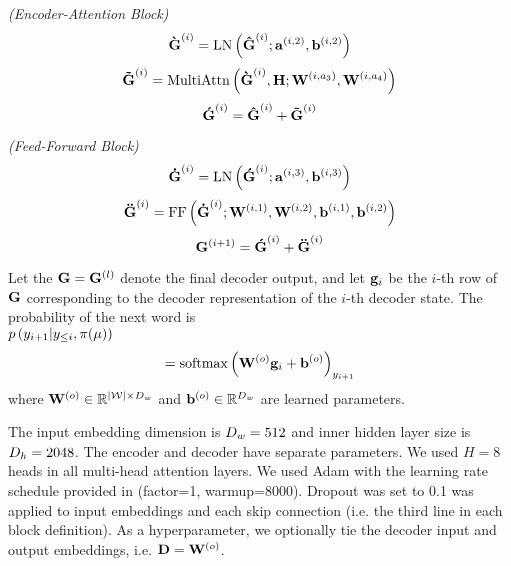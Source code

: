 \noindent \textit{(Encoder-Attention Block)}\\
\[\boldsymbol{\grave{\mathbf{G}}}^{(i)} = \operatorname{LN}\left(\boldsymbol{\hat{\mathbf{G}}}^{(i)}; \mathbf{a}^{(i,2)}, \mathbf{b}^{(i,2)}\right)\]
\[\boldsymbol{\tilde{\mathbf{G}}}^{(i)} = \operatorname{MultiAttn}\left(\boldsymbol{\grave{\mathbf{G}}}^{(i)}, \mathbf{H}; \mathbf{W}^{(i,a_3)}, \mathbf{W}^{(i,a_4)}\right)\]
\[\boldsymbol{\acute{\mathbf{G}}}^{(i)} = \boldsymbol{\hat{\mathbf{G}}}^{(i)} + \boldsymbol{\tilde{\mathbf{G}}}^{(i)}\]

\noindent \textit{(Feed-Forward Block)}\\
\[\boldsymbol{\dot{\mathbf{G}}}^{(i)} = \operatorname{LN}\left(\boldsymbol{\acute{\mathbf{G}}}^{(i)}; \mathbf{a}^{(i,3)}, \mathbf{b}^{(i,3)}\right)\]
\[\boldsymbol{\ddot{\mathbf{G}}}^{(i)} = \operatorname{FF}\left(\boldsymbol{\dot{\mathbf{G}}}^{(i)};\mathbf{W}^{(i,1)},\mathbf{W}^{(i,2)},\mathbf{b}^{(i,1)},\mathbf{b}^{(i,2)}\right)\]
\[ \mathbf{G}^{(i+1)} = \boldsymbol{\acute{\mathbf{G}}}^{(i)} + \boldsymbol{\ddot{\mathbf{G}}}^{(i)} \]

Let the $\mathbf{G} = \mathbf{G}^{(l)}$ denote the final decoder output,
and let $\mathbf{g}_i$ be the $i$-th row of $\mathbf{G}$ corresponding
to the decoder representation of the $i$-th decoder state. The probability of 
the next word is\\

\noindent $p\left(y_{i+1}|y_{\le i},\pi(\mu)\right)$
\[  = \operatorname{softmax}\left( \mathbf{W}^{(o)}\mathbf{g}_i + \mathbf{b}^{(o)} \right)_{y_{i+1}} \]
where $\mathbf{W}^{(o)} \in \mathbb{R}^{{\lvert \mathcal{W} \rvert} \times {D_w}}$ 
and $\mathbf{b}^{(o)} \in \mathbb{R}^{{D_w}}$ are learned parameters. 


The input embedding dimension is ${D_w}= 512$ and inner hidden layer size 
is ${D_h}=2048$. The encoder and decoder have separate parameters.
We used $H=8$ heads in all multi-head attention layers. 
 We used Adam with the learning
rate schedule provided in  \citet{rush2018} (factor=1, warmup=8000).
Dropout was set to 0.1 was applied to input embeddings and each skip 
connection (i.e. the third line in each block definition). As a 
hyperparameter, we optionally tie the decoder input and output embeddings,
i.e. $\mathbf{D} = \mathbf{W}^{(o)}$.




